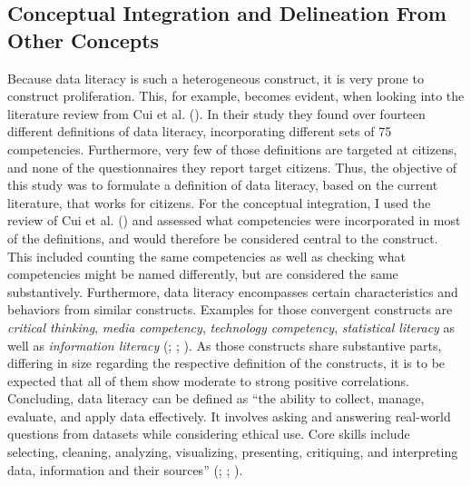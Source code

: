 \documentclass[
  12pt,
  a4paper,
  twoside]{article}
\begin{document}
\subsection{Conceptual Integration and Delineation From Other Concepts}\label{conceptual-integration-and-delineation-from-other-concepts}

Because data literacy is such a heterogeneous construct, it is very prone to construct proliferation. This, for example, becomes evident, when looking into the literature review from Cui et al. (). In their study they found over fourteen different definitions of data literacy, incorporating different sets of 75 competencies. Furthermore, very few of those definitions are targeted at citizens, and none of the questionnaires they report target citizens.
Thus, the objective of this study was to formulate a definition of data literacy, based on the current literature, that works for citizens. For the conceptual integration, I used the review of Cui et al. () and assessed what competencies were incorporated in most of the definitions, and would therefore be considered central to the construct. This included counting the same competencies as well as checking what competencies might be named differently, but are considered the same substantively. Furthermore, data literacy encompasses certain characteristics and behaviors from similar constructs. Examples for those convergent constructs are \emph{critical thinking}, \emph{media competency}, \emph{technology competency}, \emph{statistical literacy} as well as \emph{information literacy} (; ; ). As those constructs share substantive parts, differing in size regarding the respective definition of the constructs, it is to be expected that all of them show moderate to strong positive correlations.
Concluding, data literacy can be defined as ``the ability to collect, manage, evaluate, and apply data effectively. It involves asking and answering real-world questions from datasets while considering ethical use. Core skills include selecting, cleaning, analyzing, visualizing, presenting, critiquing, and interpreting data, information and their sources'' (; ; ).
\end{document}

